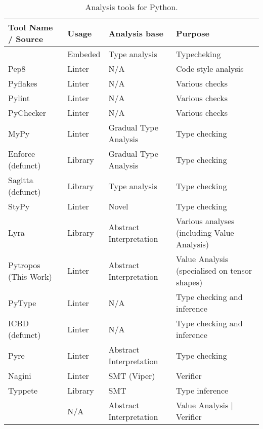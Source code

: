 \begin{sidewaystable}[p]
\centering
\begin{threeparttable}
\begin{longtable}[]{|l|l|l|l|}
  \caption{Analysis tools for Python.
  }\label{relatedworktable}\tabularnewline
  \toprule
  Tool Name / Source & Usage & Analysis base & Purpose \tabularnewline
  \midrule
  \endhead
    \textcite{cannon_localized_2005}                     & Embeded & Type analysis           & Typecheking     \tabularnewline
    Pep8\tnote{0}                                        & Linter  & N/A                     & Code style analysis \tabularnewline
    Pyflakes \autocite{pyflakes2005}                     & Linter  & N/A                     & Various checks  \tabularnewline
    Pylint \autocite{thenaultpylint}                     & Linter  & N/A                     & Various checks  \tabularnewline
    PyChecker \autocite{norwitzpychecker}                & Linter  & N/A                     & Various checks  \tabularnewline
    MyPy \autocite{lehtosalo2016mypy}                    & Linter  & Gradual Type Analysis   & Type checking   \tabularnewline
    Enforce\tnote{1}\tnote{+} (defunct)                  & Library & Gradual Type Analysis   & Type checking               \tabularnewline
    Sagitta\tnote{2}\tnote{+} (defunct)                  & Library & Type analysis           & Type checking               \tabularnewline
    StyPy \autocite{ortin_towards_2015}                  & Linter  & Novel                   & Type checking               \tabularnewline
    Lyra\tnote{3}                                        & Library & Abstract Interpretation & Various analyses (including Value Analysis) \tabularnewline
    Pytropos\tnote{4} (This Work)                        & Linter  & Abstract Interpretation & Value Analysis (specialised on tensor shapes) \tabularnewline
    PyType\tnote{5}                                      & Linter  & N/A                     & Type checking and inference \tabularnewline
    ICBD\tnote{6} (defunct)                              & Linter  & N/A                     & Type checking and inference \tabularnewline
    Pyre\tnote{7}                                        & Linter  & Abstract Interpretation & Type checking               \tabularnewline
    Nagini\tnote{8} \autocite{eilers_nagini_2018}        & Linter  & SMT (Viper)             & Verifier                    \tabularnewline
    Typpete\tnote{9} \autocite{hassan_maxsmt-based_2018} & Library & SMT                     & Type inference              \tabularnewline
    \textcite{fromherz_static_2018}\tnote{*}             & N/A     & Abstract Interpretation & Value Analysis | Verifier   \tabularnewline

\end{longtable}
\end{threeparttable}
\end{sidewaystable}
